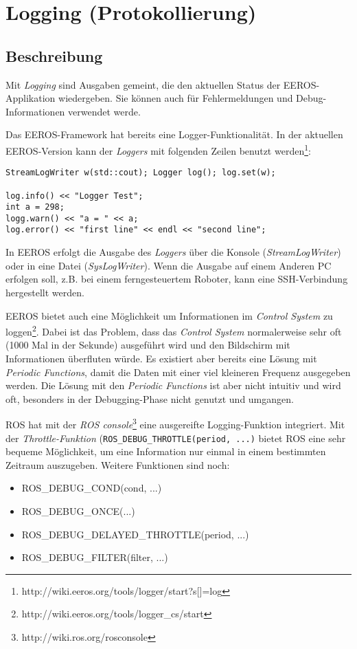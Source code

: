 \section{Logging (Protokollierung)}
\subsection{Beschreibung}
Mit \textit{Logging} sind Ausgaben gemeint, die den aktuellen Status der EEROS-Applikation wiedergeben.
Sie können auch für Fehlermeldungen und Debug-Informationen verwendet werde.

Das EEROS-Framework hat bereits eine Logger-Funktionalität.
In der aktuellen EEROS-Version kann der \textit{Loggers}  mit folgenden Zeilen benutzt werden\footnote{http://wiki.eeros.org/tools/logger/start?s[]=log}:
\lstset{language=C++}
\begin{lstlisting}
StreamLogWriter w(std::cout); Logger log(); log.set(w);

log.info() << "Logger Test";
int a = 298;
logg.warn() << "a = " << a;
log.error() << "first line" << endl << "second line"; 
\end{lstlisting}

In EEROS erfolgt die Ausgabe des \textit{Loggers} über die Konsole (\textit{StreamLogWriter}) oder in eine Datei (\textit{SysLogWriter}).
Wenn die Ausgabe auf einem Anderen PC erfolgen soll, z.B. bei einem ferngesteuertem Roboter, kann eine SSH-Verbindung hergestellt werden.

EEROS bietet auch eine Möglichkeit um Informationen im \textit{Control System} zu loggen\footnote{http://wiki.eeros.org/tools/logger\_cs/start}.
Dabei ist das Problem, dass das \textit{Control System} normalerweise sehr oft (1000 Mal in der Sekunde) ausgeführt wird und den Bildschirm mit Informationen überfluten würde.
Es existiert aber bereits eine Lösung mit \textit{Periodic Functions}, damit die Daten mit einer viel kleineren Frequenz ausgegeben werden.
Die Lösung mit den \textit{Periodic Functions} ist aber nicht intuitiv und wird oft, besonders in der Debugging-Phase nicht genutzt und umgangen.

ROS hat mit der \textit{ROS console}\footnote{http://wiki.ros.org/rosconsole} eine ausgereifte Logging-Funktion integriert.
Mit der \textit{Throttle-Funktion} (\texttt{ROS\_DEBUG\_THROTTLE(period, ...)} bietet ROS eine sehr bequeme Möglichkeit, um eine Information nur einmal in einem bestimmten Zeitraum auszugeben.
Weitere Funktionen sind noch:

\begin{itemize}
\item ROS\_DEBUG\_COND(cond, ...)
\item ROS\_DEBUG\_ONCE(...)
\item ROS\_DEBUG\_DELAYED\_THROTTLE(period, ...)
\item ROS\_DEBUG\_FILTER(filter, ...)
\end{itemize}

